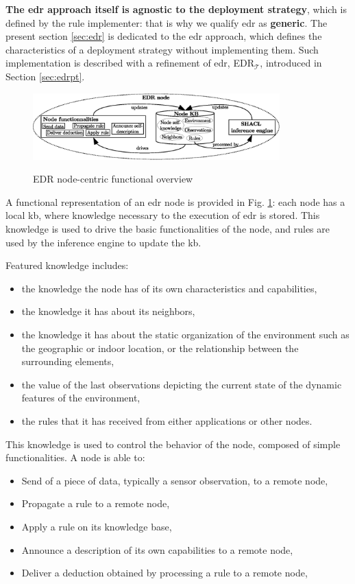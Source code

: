\documentclass{iosart2c}
\newcommand{\edrt}{EDR$_{\mathcal{T}}$\xspace}
\begin{document}
\textbf{The \gls{edr} approach itself is agnostic to the deployment strategy}, which is defined by the rule implementer: that is why we qualify \gls{edr} as \textbf{generic}. 
The present section \textsection \ref{sec:edr} is dedicated to the \gls{edr} approach, which defines the characteristics of a deployment strategy without implementing them.
Such implementation is described with a refinement of \gls{edr}, \edrt, introduced in Section \textsection \ref{sec:edrpt}.

\begin{figure}
	\centering
	\caption{EDR node-centric functional overview}
	\includegraphics[width=0.85\textwidth]{figures/overview.eps}
	\label{fig:node_overview}
\end{figure}

A functional representation of an \gls{edr} node is provided in Fig. \ref{fig:node_overview}: each node has a local \gls{kb}, where knowledge necessary to the execution of \gls{edr} is stored.
This knowledge is used to drive the basic functionalities of the node, and rules are used by the inference engine to update the \gls{kb}.

Featured knowledge includes:
\begin{itemize}
	\item the knowledge the node has of its own characteristics and capabilities,
	\item the knowledge it has about its neighbors,
	\item the knowledge it has about the static organization of the environment such as the geographic or indoor location, or the relationship between the surrounding elements,
	\item the value of the last observations depicting the current state of the dynamic features of the environment,
	\item the rules that it has received from either applications or other nodes.
\end{itemize}

This knowledge is used to control the behavior of the node, composed of simple functionalities.
A node is able to:
\begin{itemize}
	\item Send of a piece of data, typically a sensor observation, to a remote node,
	\item Propagate a rule to a remote node,
	\item Apply a rule on its knowledge base,
	\item Announce a description of its own capabilities to a remote node,
	\item Deliver a deduction obtained by processing a rule to a remote node, 
\end{itemize}
\end{document}
